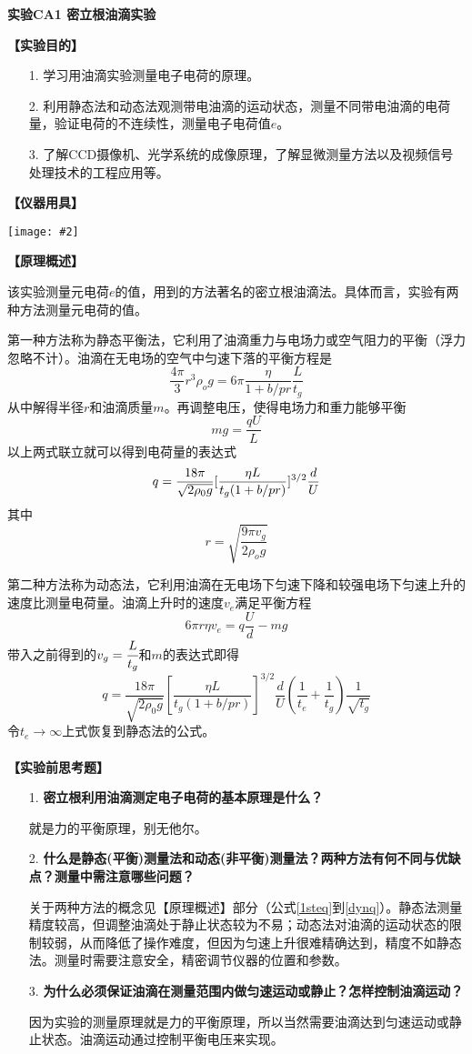 \documentclass[11pt,a4paper]{ctexart}
\newcommand{\ExpeName}{实验CA1 密立根油滴实验}
\newcommand{\cpic}[2]{
\begin{center}
\texttt{[image: \#2]}
\end{center}
}
\newcommand{\beq}{\begin{equation}}
\newcommand{\eeq}{\end{equation}}
\begin{document}
\newpage%
\begin{center}
\LARGE{\textbf{\ExpeName}}
\end{center}
\textbf{【实验目的】}
\begin{enumerate}
 \item[1.] 学习用油滴实验测量电子电荷的原理。
 \item[2.] 利用静态法和动态法观测带电油滴的运动状态，测量不同带电油滴的电荷量，验证电荷的不连续性，测量电子电荷值$e$。
 \item[3.] 了解CCD摄像机、光学系统的成像原理，了解显微测量方法以及视频信号处理技术的工程应用等。
\end{enumerate}
\textbf{【仪器用具】}
\cpic{0.3}{t1}
\textbf{【原理概述】}\par
该实验测量元电荷$e$的值，用到的方法著名的密立根油滴法。具体而言，实验有两种方法测量元电荷的值。
\par
第一种方法称为静态平衡法，它利用了油滴重力与电场力或空气阻力的平衡（浮力忽略不计）。油滴在无电场的空气中匀速下落的平衡方程是
\beq \label{1steq}
\frac{4\pi}{3}r^3 \rho_o g = 6\pi \frac{\eta}{1 + b/p r} \frac{L}{t_g}
\eeq
从中解得半径$r$和油滴质量$m$。再调整电压，使得电场力和重力能够平衡
\beq
mg = \frac{qU}{L}
\eeq
以上两式联立就可以得到电荷量的表达式
\beq \label{staq}
q = \frac{18\pi}{\sqrt{2\rho_0 g}}[\frac{\eta L}{t_g (1 + b/p r)}]^{3/2} \frac{d}{U} \\
\eeq
其中
\beq
r = \sqrt{\frac{9\pi v_g}{2\rho_o g}}
\eeq
\par
第二种方法称为动态法，它利用油滴在无电场下匀速下降和较强电场下匀速上升的速度比测量电荷量。油滴上升时的速度$v_e$满足平衡方程
\beq
6\pi r \eta v_e = q\frac{U}{d} - mg
\eeq
带入之前得到的$v_g = \cfrac{L}{t_g}$和$m$的表达式即得
\beq \label{dynq}
q = \frac{18\pi}{\sqrt{2\rho_0 g}}[\frac{\eta L}{t_g (1 + b/p r)}]^{3/2} \frac{d}{U} (\frac{1}{t_e} +\frac{1}{t_g}) \frac{1}{\sqrt{t_g}}
\eeq
令$t_e \to \infty$上式恢复到静态法的公式。
\\
\ 
\\
\textbf{【实验前思考题】}
\begin{enumerate}
 \item[1.] \textbf{密立根利用油滴测定电子电荷的基本原理是什么？}\par
就是力的平衡原理，别无他尔。
 \item[2.] \textbf{什么是静态(平衡)测量法和动态(非平衡)测量法？两种方法有何不同与优缺点？测量中需注意哪些问题？}\par
关于两种方法的概念见【原理概述】部分（公式\cref{1steq}到\cref{dynq}）。静态法测量精度较高，但调整油滴处于静止状态较为不易；动态法对油滴的运动状态的限制较弱，从而降低了操作难度，但因为匀速上升很难精确达到，精度不如静态法。测量时需要注意安全，精密调节仪器的位置和参数。
\item[3.] \textbf{为什么必须保证油滴在测量范围内做匀速运动或静止？怎样控制油滴运动？}\par
因为实验的测量原理就是力的平衡原理，所以当然需要油滴达到匀速运动或静止状态。油滴运动通过控制平衡电压来实现。
\end{enumerate}
\end{document}
